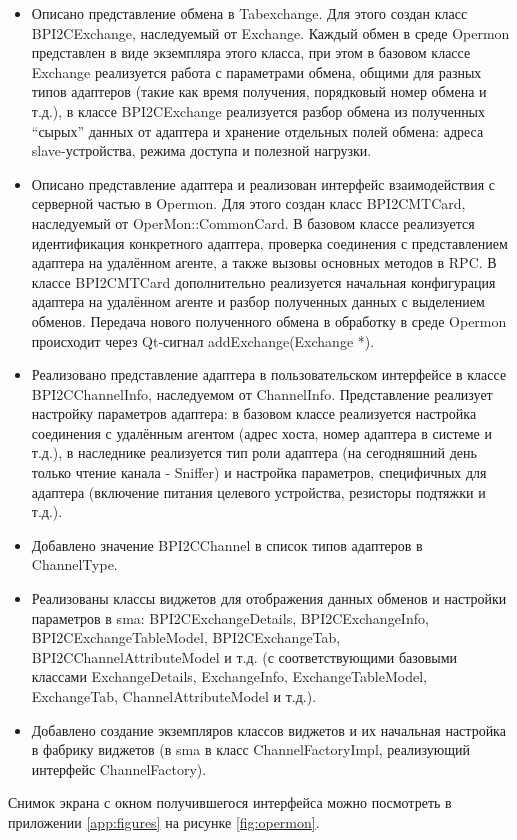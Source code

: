 \begin{itemize}
 \item Описано представление обмена в Tabexchange. Для этого создан класс BPI2CExchange, наследуемый от Exchange. Каждый обмен в среде Opermon представлен в виде экземпляра этого класса, при этом в базовом классе Exchange реализуется работа с параметрами обмена, общими для разных типов адаптеров (такие как время получения, порядковый номер обмена и т.д.), в классе BPI2CExchange реализуется разбор обмена из полученных ``сырых'' данных от адаптера и хранение отдельных полей обмена: адреса slave-устройства, режима доступа и полезной нагрузки.
 \item Описано представление адаптера и реализован интерфейс взаимодействия с серверной частью в Opermon. Для этого создан класс BPI2CMTCard, наследуемый от OperMon::CommonCard. В базовом классе реализуется идентификация конкретного адаптера, проверка соединения с представлением адаптера на удалённом агенте, а также вызовы основных методов в RPC. В классе BPI2CMTCard дополнительно реализуется начальная конфигурация адаптера на удалённом агенте и разбор полученных данных с выделением обменов. Передача нового полученного обмена в обработку в среде Opermon происходит через Qt-сигнал addExchange(Exchange *).
 \item Реализовано представление адаптера в пользовательском интерфейсе в классе BPI2CChannelInfo, наследуемом от ChannelInfo. Представление реализует настройку параметров адаптера: в базовом классе реализуется настройка соединения с удалённым агентом (адрес хоста, номер адаптера в системе и т.д.), в наследнике реализуется тип роли адаптера (на сегодняшний день только чтение канала - Sniffer) и настройка параметров, специфичных для адаптера (включение питания целевого устройства, резисторы подтяжки и т.д.).
 \item Добавлено значение BPI2CChannel в список типов адаптеров в ChannelType.
 \item Реализованы классы виджетов для отображения данных обменов и настройки параметров в sma: BPI2CExchangeDetails, BPI2CExchangeInfo, BPI2CExchangeTableModel, BPI2CExchangeTab, BPI2CChannelAttributeModel  и т.д. (с соответствующими базовыми классами ExchangeDetails, ExchangeInfo, ExchangeTableModel, ExchangeTab, ChannelAttributeModel и т.д.).
 \item Добавлено создание экземпляров классов виджетов и их начальная настройка в фабрику виджетов (в sma в класс ChannelFactoryImpl, реализующий интерфейс ChannelFactory).
\end{itemize}


Снимок экрана с окном получившегося интерфейса можно посмотреть в приложении \ref{app:figures} на рисунке \ref{fig:opermon}.